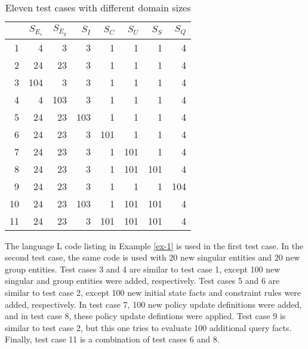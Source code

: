 \documentclass[global,twocolumn,final]{svjour}
\begin{document}
      \begin{table}[ht]
        \begin{center}
          \begin{tabular}[t]{|r|r|r|r|r|r|r|r|}
            \hline
            &
            \textbf{$S_{E_{s}}$} &
            \textbf{$S_{E_{g}}$} &
            \textbf{$S_{I}$} &
            \textbf{$S_{C}$} &
            \textbf{$S_{U}$} &
            \textbf{$S_{S}$} &
            \textbf{$S_{Q}$} \\
            \hline
            1 & 4 & 3 & 3 & 1 & 1 & 1 & 4 \\
            \hline
            2 & 24 & 23 & 3 & 1 & 1 & 1 & 4 \\
            \hline
            3 & 104 & 3 & 3 & 1 & 1 & 1 & 4 \\
            \hline
            4 & 4 & 103 & 3 & 1 & 1 & 1 & 4 \\
            \hline
            5 & 24 & 23 & 103 & 1 & 1 & 1 & 4 \\
            \hline
            6 & 24 & 23 & 3 & 101 & 1 & 1 & 4 \\
            \hline
            7 & 24 & 23 & 3 & 1 & 101 & 1 & 4 \\
            \hline
            8 & 24 & 23 & 3 & 1 & 101 & 101 & 4 \\
            \hline
            9 & 24 & 23 & 3 & 1 & 1 & 1 & 104 \\
            \hline
            10 & 24 & 23 & 103 & 1 & 101 & 101 & 4 \\
            \hline
            11 & 24 & 23 & 3 & 101 & 101 & 101 & 4 \\
            \hline
          \end{tabular}
        \end{center}
        \caption[]{Eleven test cases with different domain sizes}
        \label{tab-1}
      \end{table}

      The language {\cal L} code listing in Example \ref{ex-1} is used in the
      first test case. In the second test case, the same code is used with 20
      new singular entities and 20 new group entities. Test cases 3 and 4 are
      similar to test case 1, except 100 new singular and group entities were
      added, respectively. Test cases 5 and 6 are similar to test case 2,
      except 100 new initial state facts and constraint rules were added,
      respectively. In test case 7, 100 new policy update definitions were
      added, and in test case 8, these policy update defintions were applied.
      Test case 9 is similar to test case 2, but this one tries to evaluate 100
      additional query facts. Finally, test case 11 is a combination of test
      cases 6 and 8.
\end{document}
